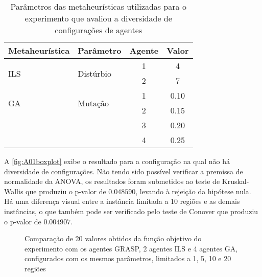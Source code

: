 \begin{table}[ht!]
    \centering
    \caption{Parâmetros das metaheurísticas utilizadas para o experimento que avaliou a diversidade de configurações de agentes}
    \begin{tabular}{llcc}
        \toprule
         \textbf{Metaheurística}    & \textbf{Parâmetro}            & \textbf{Agente}       & \textbf{Valor}    \\
         \midrule
         \multirow{2}{*}{ILS}       & \multirow{2}{*}{Distúrbio}    & 1                     & 4         \\
                                    &                               & 2                     & 7         \\
         \midrule
         \multirow{2}{*}{GA}        & \multirow{2}{*}{Mutação}      & 1                     & 0.10      \\
                                    &                               & 2                     & 0.15      \\
                                    &                               & 3                     & 0.20      \\
                                    &                               & 4                     & 0.25      \\
        \bottomrule
    \end{tabular}
    \label{tab:expDiversidade}
\end{table}

A \autoref{fig:A01boxplot} exibe o resultado para a configuração na qual não há diversidade de configurações. Não tendo sido possível verificar a premissa de normalidade da ANOVA, os resultados foram submetidos ao teste de Kruskal-Wallis que produziu o p-valor de $0.048590$, levando à rejeição da hipótese nula. Há uma diferença visual entre a instância limitada a 10 regiões e as demais instâncias, o que também pode ser verificado pelo teste de Conover que produziu o p-valor de $0.004907$. 

\begin{figure}
    \centering
    \caption{Comparação de 20 valores obtidos da função objetivo do experimento com os agentes GRASP, 2 agentes ILS e 4 agentes GA, configurados com os mesmos parâmetros, limitados a 1, 5, 10 e 20 regiões}
    
    \label{fig:A01boxplot}
\end{figure}

